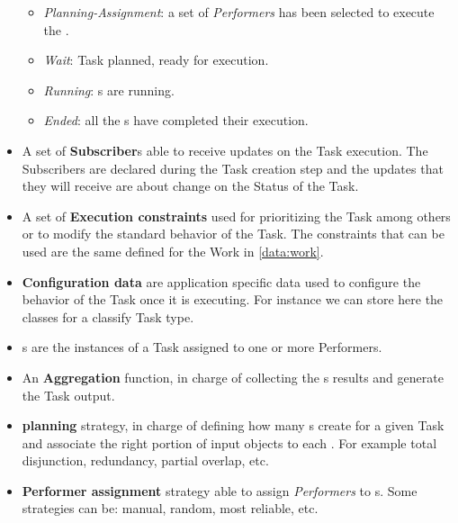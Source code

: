 \begin{itemize}
\begin{itemize}
            \item \emph{Planning-Assignment}: a set of \emph{Performers} has
            been selected to execute the \utask{}.
            
            \item \emph{Wait}: Task planned, \utask{} ready for execution.
            
            \item \emph{Running}: \utask{}s are running.
            
            \item \emph{Ended}: all the \utask{}s have completed their execution.
        \end{itemize}
    
    \item A set of \textbf{Subscriber}s able to receive updates on the Task
    execution. The Subscribers are declared during the Task creation step and the
    updates that they will receive are about change on the Status of the Task.

    \item A set of \textbf{Execution constraints} used for prioritizing the Task
    among others or to modify the standard behavior of the Task. The constraints
    that can be used are the same defined for the Work in \ref{data:work}.

    \item \textbf{Configuration data} are application specific data used to
    configure the behavior of the Task once it is executing. For instance
    we can store here the classes for a classify Task type.

    \item \textbf{\utask{}}s are the instances of a Task assigned to one or more
    Performers.

    \item An \textbf{Aggregation} function, in charge of collecting the \utask{}s
    results and generate the Task output.
    
    \item \textbf{\utask{} planning} strategy, in charge of defining how many
    \utask{}s create for a given Task and associate the right portion of input
    objects to each \utask{}. For example total disjunction, redundancy, partial
    overlap, etc.
    
    \item \textbf{Performer assignment} strategy able to assign \emph{Performers}
    to \utask{}s. Some strategies can be: manual, random, most reliable, etc.


\end{itemize}
